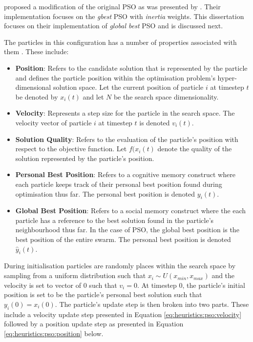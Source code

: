 \citeauthor{ref:shi:1998}\cite{ref:shi:1998} proposed a modification of the original \ac{PSO} as was presented by \citeauthor{ref:kennedy:1995}. Their implementation focuses on the \textit{gbest} \ac{PSO} with \textit{inertia} weights. This dissertation focuses on their implementation of \textit{global best} \ac{PSO} and is discussed next.

The particles in this configuration has a number of properties associated with them \cite{ref:vanwyk:2014}. These include:

\begin{itemize}
    \item \textbf{Position}: Refers to the candidate solution that is represented by the particle and defines the particle position within the optimisation problem's hyper-dimensional solution space. Let the current position of particle $i$ at timestep $t$ be denoted by $x_{i}(t)$ and let $N$ be the search space dimensionality. 
    \item \textbf{Velocity}: Represents a step size for the particle in the search space. The velocity vector of particle $i$ at timestep $t$ is denoted $v_{i}(t)$. 
    \item \textbf{Solution Quality}: Refers to the evaluation of the particle's position with respect to the objective function. Let $f(x_{i}(t)$ denote the quality of the solution represented by the particle's position.
    \item \textbf{Personal Best Position}: Refers to a cognitive memory construct where each particle keeps track of their personal best position found during optimisation thus far. The personal best position is denoted $y_{i}(t)$.
    \item \textbf{Global Best Position}: Refers to a social memory construct where the each particle has a reference to the best solution found in the particle's neighbourhood thus far. In the case of  \ac{PSO}, the global best position is the best position of the entire swarm. The personal best position is denoted $\hat{y}_{i}(t)$.
\end{itemize}

During initialisation particles are randomly places within the search space by sampling from a uniform distribution such that $x_{i} \sim U(x_{min}, x_{max})$ and the velocity is set to vector of 0 such that $v_{i} = 0$. At timestep 0, the particle's initial position is set to be the particle's personal best solution such that $y_{i}(0) = x_{i}(0)$. The particle's update step is then broken into two parts. These include a velocity update step presented in Equation \ref{eq:heuristics:pso:velocity} followed by a position update step as presented in Equation \ref{eq:heuristics:pso:position} below.

